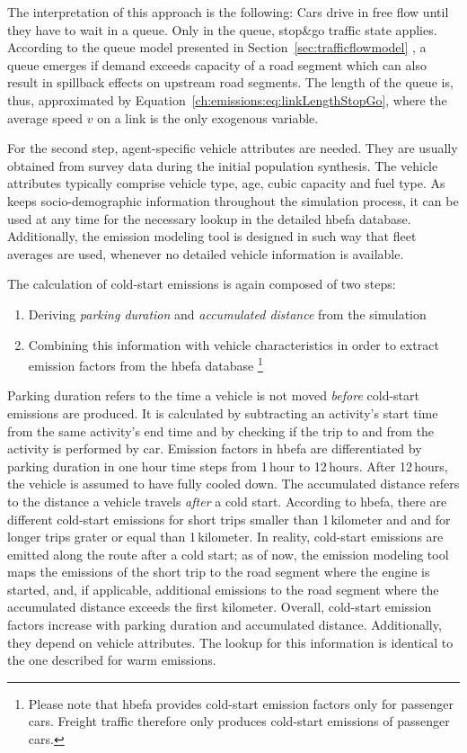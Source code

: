 %
The interpretation of this approach is the following:
%
Cars drive in free flow until they have to wait in a queue. Only in the queue, stop\&go traffic state applies. According to the  queue model presented in Section~\ref{sec:trafficflowmodel}
%
%
, a queue emerges if demand exceeds capacity of a road segment which can also result in spillback effects on upstream road segments. The length of the queue is, thus, approximated by Equation~\ref{ch:emissions:eq:linkLengthStopGo}, where the average speed $v$ on a link is the only exogenous variable.

For the second step, agent-specific vehicle attributes are needed. They are 
usually obtained from survey data during the initial population 
synthesis. The vehicle attributes typically comprise vehicle type, age, cubic 
capacity 
and fuel type. As  keeps socio-demographic information throughout 
the 
simulation process, it can be used at any time for the necessary lookup in the 
detailed \gls{hbefa} database. Additionally, the emission modeling tool 
is designed in such way that fleet averages are used, whenever no detailed 
vehicle information is available.

The calculation of cold-start emissions is again composed of two steps:
%
\begin{enumerate}
 \item Deriving \emph{parking duration} and \emph{accumulated distance} 
 from the simulation
 \item Combining this information with vehicle characteristics in order to 
 extract emission factors from the \gls{hbefa} database%
 \footnote{
 Please note that \gls{hbefa} provides cold-start emission factors only for 
 passenger cars. Freight traffic therefore only produces cold-start emissions 
 of passenger cars.
 }
\end{enumerate}
%
Parking duration refers to the time a vehicle is not moved \emph{before} 
cold-start emissions are produced. It is calculated by subtracting an 
activity's start time from the same activity's end time and by checking if the 
trip to and from the activity is performed by car. Emission factors in 
\gls{hbefa} 
are differentiated by parking duration in one hour time steps from 1\,hour to 
12\,hours. After 12\,hours, the vehicle is assumed to have fully cooled down.
%
The accumulated distance refers to the distance a vehicle travels \emph{after} 
a cold start. According to \gls{hbefa}, there are different cold-start 
emissions for short trips smaller than 1\,kilometer and and for longer trips grater or equal than 1\,kilometer.
%
In reality, cold-start emissions are emitted along the route after a cold start;
as of now, the emission modeling tool maps the emissions of the short trip to the road
segment where the engine is started, and, if applicable, additional emissions
to the road segment where the accumulated distance exceeds the first kilometer.
%
Overall, cold-start emission factors increase with parking duration and 
accumulated distance. Additionally, they depend on vehicle attributes. The 
lookup for this information is identical to the one described for warm 
emissions.

